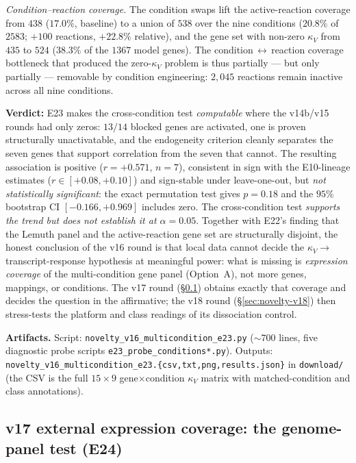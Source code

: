 \documentclass[11pt,a4paper]{article}
\theoremstyle{plain}
\theoremstyle{definition}
\theoremstyle{remark}
\begin{document}
\emph{Condition--reaction coverage.} The condition swaps lift the
active-reaction coverage from $438$ ($17.0\%$, baseline) to a union
of $538$ over the nine conditions ($20.8\%$ of $2583$; $+100$
reactions, $+22.8\%$ relative), and the gene set with non-zero
$\kappa_V$ from $435$ to $524$ ($38.3\%$ of the $1367$ model genes).
The condition$\,\leftrightarrow\,$reaction coverage bottleneck that
produced the zero-$\kappa_V$ problem is thus partially --- but only
partially --- removable by condition engineering: $2{,}045$ reactions
remain inactive across all nine conditions.

\textbf{Verdict:} E23 makes the cross-condition test \emph{computable}
where the v14b/v15 rounds had only zeros: $13/14$ blocked genes are
activated, one is proven structurally unactivatable, and the
endogeneity criterion cleanly separates the seven genes that support
correlation from the seven that cannot. The resulting association is
positive ($r = +0.571$, $n = 7$), consistent in sign with the
E10-lineage estimates ($r \in [+0.08, +0.10]$) and sign-stable under
leave-one-out, but \emph{not statistically significant}: the exact
permutation test gives $p = 0.18$ and the $95\%$ bootstrap CI
$[-0.166, +0.969]$ includes zero. The cross-condition test
\emph{supports the trend but does not establish it at $\alpha =
0.05$}. Together with E22's finding that the Lemuth panel and the
active-reaction gene set are structurally disjoint, the honest
conclusion of the v16 round is that local data cannot decide the
$\kappa_V \to$ transcript-response hypothesis at meaningful power:
what is missing is \emph{expression coverage} of the
multi-condition gene panel (Option~A), not more genes, mappings, or
conditions. The v17 round (\S\ref{sec:novelty-v17}) obtains exactly
that coverage and decides the question in the affirmative; the v18
round (\S\ref{sec:novelty-v18}) then stress-tests the platform and
class readings of its dissociation control.

\textbf{Artifacts.} Script:
\texttt{novelty\_v16\_multicondition\_e23.py} ($\sim$$700$ lines,
five diagnostic probe scripts \texttt{e23\_probe\_conditions*.py}).
Outputs:
\texttt{novelty\_v16\_multicondition\_e23.\{csv,txt,png,results.json\}}
in \texttt{download/} (the CSV is the full $15 \times 9$
gene$\times$condition $\kappa_V$ matrix with matched-condition and
class annotations).


\subsection{v17 external expression coverage: the genome-panel
test (E24)}\label{sec:novelty-v17}
\end{document}
